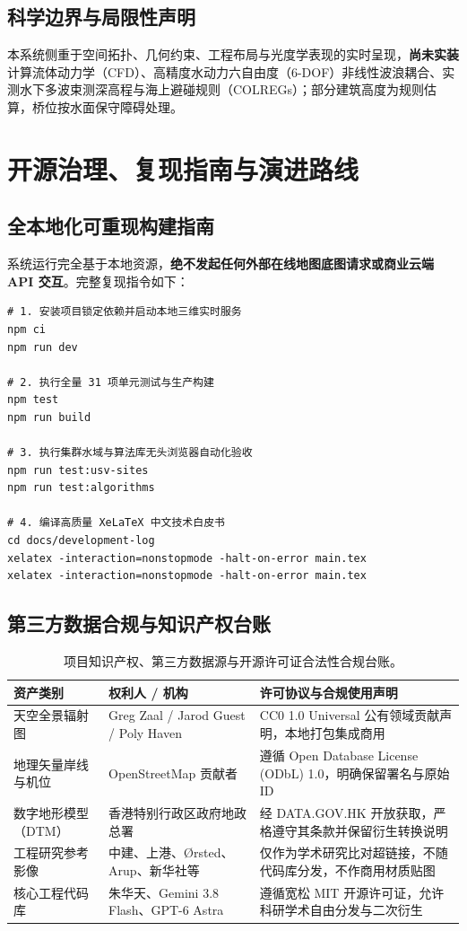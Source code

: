 \documentclass[UTF8,a4paper,11pt,fontset=fandol]{ctexart}
\begin{document}
\subsection{科学边界与局限性声明}
本系统侧重于空间拓扑、几何约束、工程布局与光度学表现的实时呈现，\textbf{尚未实装}计算流体动力学（CFD）、高精度水动力六自由度（6-DOF）非线性波浪耦合、实测水下多波束测深高程与海上避碰规则（COLREGs）；部分建筑高度为规则估算，桥位按水面保守障碍处理。

\section{开源治理、复现指南与演进路线}

\subsection{全本地化可重现构建指南}
系统运行完全基于本地资源，\textbf{绝不发起任何外部在线地图底图请求或商业云端 API 交互}。完整复现指令如下：

\begin{lstlisting}
# 1. 安装项目锁定依赖并启动本地三维实时服务
npm ci
npm run dev

# 2. 执行全量 31 项单元测试与生产构建
npm test
npm run build

# 3. 执行集群水域与算法库无头浏览器自动化验收
npm run test:usv-sites
npm run test:algorithms

# 4. 编译高质量 XeLaTeX 中文技术白皮书
cd docs/development-log
xelatex -interaction=nonstopmode -halt-on-error main.tex
xelatex -interaction=nonstopmode -halt-on-error main.tex
\end{lstlisting}

\subsection{第三方数据合规与知识产权台账}
\begin{table}[H]\centering\small
\begin{tabularx}{\linewidth}{@{}llX@{}}\toprule
资产类别 & 权利人 / 机构 & 许可协议与合规使用声明\\\midrule
天空全景辐射图 & Greg Zaal / Jarod Guest / Poly Haven & CC0 1.0 Universal 公有领域贡献声明，本地打包集成商用\\
地理矢量岸线与机位 & OpenStreetMap 贡献者 & 遵循 Open Database License (ODbL) 1.0，明确保留署名与原始 ID\\
数字地形模型（DTM） & 香港特别行政区政府地政总署 & 经 DATA.GOV.HK 开放获取，严格遵守其条款并保留衍生转换说明\\
工程研究参考影像 & 中建、上港、Ørsted、Arup、新华社等 & 仅作为学术研究比对超链接，不随代码库分发，不作商用材质贴图\\
核心工程代码库 & 朱华天、Gemini 3.8 Flash、GPT-6 Astra & 遵循宽松 MIT 开源许可证，允许科研学术自由分发与二次衍生\\\bottomrule
\end{tabularx}
\caption{项目知识产权、第三方数据源与开源许可证合法性合规台账。}
\end{table}
\end{document}
